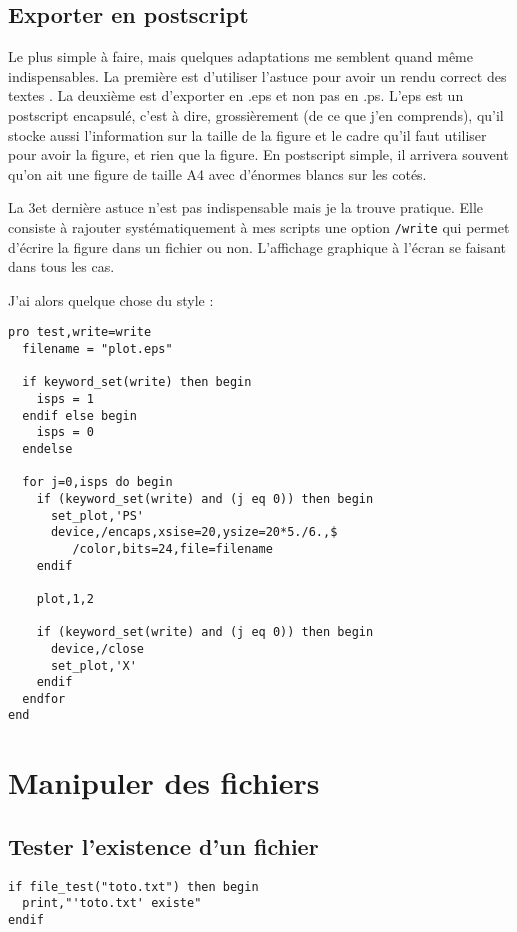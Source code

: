 \documentclass[a4paper,twoside]{article}
\begin{document}
\subsection{Exporter en postscript}
Le plus simple à faire, mais quelques adaptations me semblent quand même indispensables. La première est d'utiliser l'astuce pour avoir un rendu correct des textes . La deuxième est d'exporter en .eps et non pas en .ps. L'eps est un postscript encapsulé, c'est à dire, grossièrement (de ce que j'en comprends), qu'il stocke aussi l'information sur la taille de la figure et le cadre qu'il faut utiliser pour avoir la figure, et rien que la figure. En postscript simple, il arrivera souvent qu'on ait une figure de taille A4 avec d'énormes blancs sur les cotés.

La 3\ieme et dernière astuce n'est pas indispensable mais je la trouve pratique. Elle consiste à rajouter systématiquement à mes scripts une option \texttt{/write} qui permet d'écrire la figure dans un fichier ou non. L'affichage graphique à l'écran se faisant dans tous les cas.

J'ai alors quelque chose du style :
\begin{lstlisting}[language=IDL]
pro test,write=write
  filename = "plot.eps"

  if keyword_set(write) then begin
    isps = 1
  endif else begin
    isps = 0
  endelse

  for j=0,isps do begin
    if (keyword_set(write) and (j eq 0)) then begin
      set_plot,'PS'
      device,/encaps,xsise=20,ysize=20*5./6.,$
	     /color,bits=24,file=filename
    endif

    plot,1,2

    if (keyword_set(write) and (j eq 0)) then begin
      device,/close
      set_plot,'X'
    endif
  endfor
end
\end{lstlisting}


\section{Manipuler des fichiers}
\subsection{Tester l'existence d'un fichier}
\begin{lstlisting}[language=IDL]
if file_test("toto.txt") then begin
  print,"'toto.txt' existe"
endif
\end{lstlisting}
\end{document}
